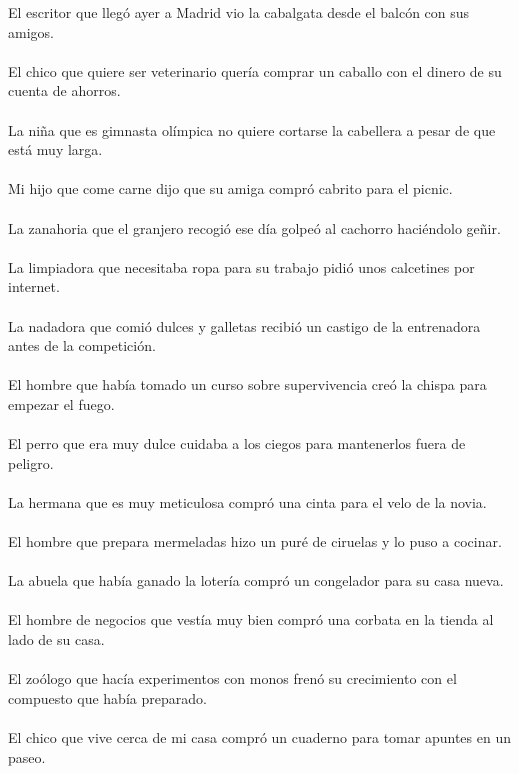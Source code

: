 El escritor que llegó ayer a Madrid vio la cabalgata desde el balcón con sus amigos.	\\	\\
El chico que quiere ser veterinario quería comprar un caballo con el dinero de su cuenta de ahorros.	\\	\\
La niña que es gimnasta olímpica no quiere cortarse la cabellera a pesar de que está muy larga.	\\	\\
Mi hijo que come carne dijo que su amiga compró cabrito para el picnic.	\\	\\
La zanahoria que el granjero recogió ese día golpeó al cachorro haciéndolo geñir.	\\	\\
La limpiadora que necesitaba ropa para su trabajo pidió unos calcetines por internet.	\\	\\
La nadadora que comió dulces y galletas recibió un castigo de la entrenadora antes de la competición.	\\	\\
El hombre que había tomado un curso sobre supervivencia creó la chispa para empezar el fuego.	\\	\\
El perro que era muy dulce cuidaba a los ciegos para mantenerlos fuera de peligro.	\\	\\
La hermana que es muy meticulosa compró una cinta para el velo de la novia.	\\	\\
El hombre que prepara mermeladas hizo un puré de ciruelas y lo puso a cocinar.	\\	\\
La abuela que había ganado la lotería compró un congelador para su casa nueva.	\\	\\
El hombre de negocios que vestía muy bien compró una corbata en la tienda al lado de su casa.	\\	\\
El zoólogo que hacía experimentos con monos frenó su crecimiento con el compuesto que había preparado.	\\	\\
El chico que vive cerca de mi casa compró un cuaderno para tomar apuntes en un paseo.	\\	\\
